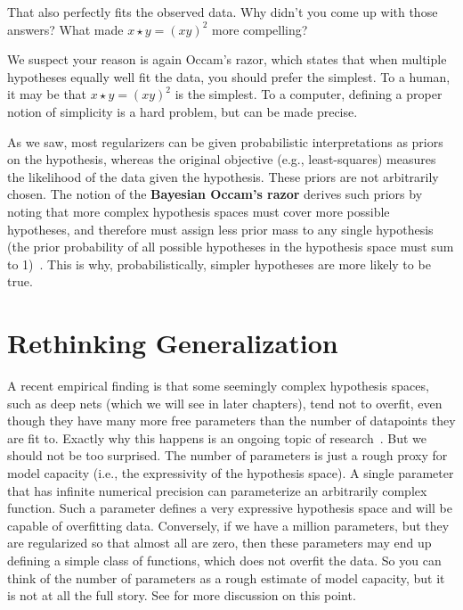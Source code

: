 That also perfectly fits the observed data. Why didn't you come up with those answers? What made $x \star y = (xy)^2$ more compelling?

We suspect your reason is again Occam's razor, which states that when multiple hypotheses equally well fit the data, you should prefer the simplest. To a human, it may be that $x \star y = (xy)^2$ is the simplest. To a computer, defining a proper notion of simplicity is a hard problem, but can be made precise.

As we saw, most regularizers can be given probabilistic interpretations as priors on the hypothesis, whereas the original objective (e.g., least-squares) measures the likelihood of the data given the hypothesis. These priors are not arbitrarily chosen. The notion of the {\bf Bayesian Occam's razor} derives such priors by noting that more complex hypothesis spaces must cover more possible hypotheses, and therefore must assign less prior mass to any single hypothesis (the prior probability of all possible hypotheses in the hypothesis space must sum to 1)~\cite{jefferys1992ockham, mackay2003information}. This is why, probabilistically, simpler hypotheses are more likely to be true.

\section{Rethinking Generalization} \label{sect:problem_of_generalization:rethinking_generalization}
A recent empirical finding is that some seemingly complex hypothesis spaces, such as deep nets (which we will see in later chapters), tend not to overfit, even though they have many more free parameters than the number of datapoints they are fit to. Exactly why this happens is an ongoing topic of research~\cite{zhang2016understanding}. But we should not be too surprised. The number of parameters is just a rough proxy for model capacity (i.e., the expressivity of the hypothesis space). A single parameter that has infinite numerical precision can parameterize an arbitrarily complex function. Such a parameter defines a very expressive hypothesis space and will be capable of overfitting data. Conversely, if we have a million parameters, but they are regularized so that almost all are zero, then these parameters may end up defining a simple class of functions, which does not overfit the data. So you can think of the number of parameters as a rough estimate of model capacity, but it is not at all the full story. See \cite{belkin2018reconciling} for more discussion on this point.%

